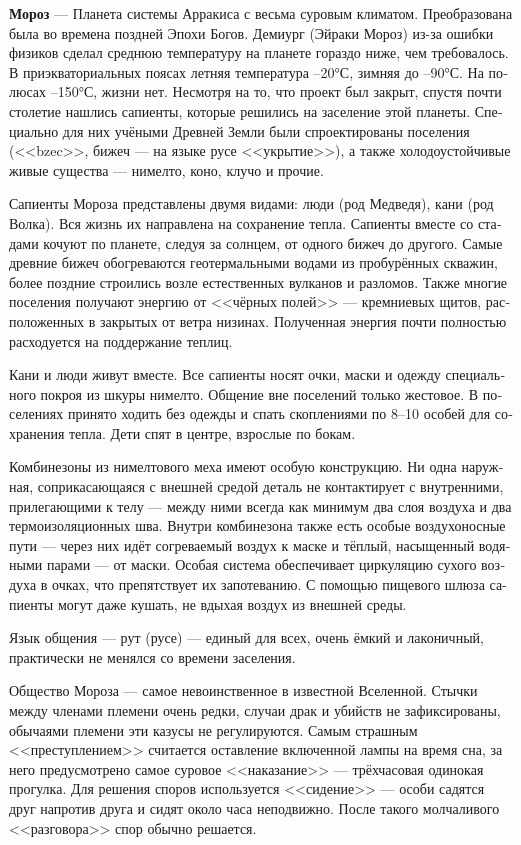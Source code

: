 \documentclass[a4paper,12pt,fleqn]{book}\usepackage{polyglossia}\setdefaultlanguage[babelshorthands=true]{russian}\setotherlanguage{english}\defaultfontfeatures{Ligatures=TeX,Mapping=tex-text}\usepackage{xcolor}\newcommand{\ml}[3]{#2}
\newcommand{\theterm}[3]{\textbf{\hypertarget{#1}{#2}} --- #3}
\begin{document}
\theterm{moros}
{Мороз}
{Планета системы Арракиса с весьма суровым климатом.
Преобразована была во времена поздней Эпохи Богов.
Демиург (Эйраки Мороз) из-за ошибки физиков сделал среднюю температуру на планете гораздо ниже, чем требовалось.
В приэкваториальных поясах летняя температура --20°С, зимняя до --90°С. На полюсах --150°С, жизни нет.
Несмотря на то, что проект был закрыт, спустя почти столетие нашлись сапиенты, которые решились на заселение этой планеты.
Специально для них учёными Древней Земли были спроектированы поселения (<<bzec>>, бижеч --- на языке русе <<укрытие>>), а также холодоустойчивые живые существа --- нимелто, коно, клучо и прочие.

Сапиенты Мороза представлены двумя видами: люди (род Медведя), кани (род Волка).
Вся жизнь их направлена на сохранение тепла.
Сапиенты вместе со стадами кочуют по планете, следуя за солнцем, от одного бижеч до другого.
Самые древние бижеч обогреваются геотермальными водами из пробурённых скважин, более поздние строились возле естественных вулканов и разломов.
Также многие поселения получают энергию от <<чёрных полей>> --- кремниевых щитов, расположенных в закрытых от ветра низинах.
Полученная энергия почти полностью расходуется на поддержание теплиц.

Кани и люди живут вместе.
Все сапиенты носят очки, маски и одежду специального покроя из шкуры нимелто.
Общение вне поселений только жестовое.
В поселениях принято ходить без одежды и спать скоплениями по 8--10 особей для сохранения тепла.
Дети спят в центре, взрослые по бокам.

Комбинезоны из нимелтового меха имеют особую конструкцию.
Ни одна наружная, соприкасающаяся с внешней средой деталь не контактирует с внутренними, прилегающими к телу --- между ними всегда как минимум два слоя воздуха и два термоизоляционных шва.
Внутри комбинезона также есть особые воздухоносные пути --- через них идёт согреваемый воздух к маске и тёплый, насыщенный водяными парами --- от маски.
Особая система обеспечивает циркуляцию сухого воздуха в очках, что препятствует их запотеванию.
С помощью пищевого шлюза сапиенты могут даже кушать, не вдыхая воздух из внешней среды.

Язык общения --- рут (русе) --- единый для всех, очень ёмкий и лаконичный, практически не менялся со времени заселения.

Общество Мороза --- самое невоинственное в известной Вселенной.
Стычки между членами племени очень редки, случаи драк и убийств не зафиксированы, обычаями племени эти казусы не регулируются.
Самым страшным <<преступлением>> считается оставление включенной лампы на время сна, за него предусмотрено самое суровое <<наказание>> --- трёхчасовая одинокая прогулка.
Для решения споров используется <<сидение>> --- особи садятся друг напротив друга и сидят около часа неподвижно.
После такого молчаливого <<разговора>> спор обычно решается.

}
\end{document}
